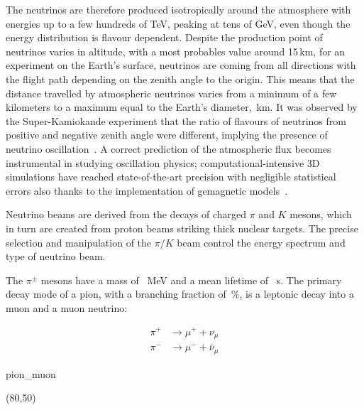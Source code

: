 The neutrinos are therefore produced isotropically around the atmosphere with energies up to a few hundreds of TeV, %
peaking at tens of GeV, even though the energy distribution is flavour dependent.
Despite the production point of neutrinos varies in altitude, with a most probables value around 15\,km,
for an experiment on the Earth's surface, neutrinos are coming from all directions with the flight path depending %
on the zenith angle to the origin.
This means that the distance travelled by atmospheric neutrinos varies from a minimum of a few kilometers %
to a maximum equal to the Earth's diameter, \,km.
It was observed by the Super-Kamiokande experiment that the ratio of flavours of neutrinos from %
positive and negative zenith angle were different, implying the presence of neutrino oscillation~\cite{Fukuda:1998mi}.
A correct prediction of the atmospheric flux becomes instrumental in studying oscillation physics; %
computational-intensive 3D simulations have reached state-of-the-art precision with negligible statistical errors %
also thanks to the implementation of gemagnetic models~\cite{Honda:2004yz, Honda:2006qj}.


Neutrino beams are derived from the decays of charged $\pi$ and $K$ mesons, which in turn are created from %
proton beams striking thick nuclear targets.
The precise selection and manipulation of the $\pi/K$ beam control the energy spectrum and type of neutrino beam.

The $\pi^{\pm}$ mesons have a mass of ~MeV and a mean lifetime of ~s.
The primary decay mode of a pion, with a branching fraction of \,\%, is a leptonic %
decay into a muon and a muon neutrino:

\begin{minipage}[c][3cm][c]{0.5\textwidth}
	\centering
	\begin{align}
		\pi^+ &\rightarrow \mu^+ + \nu_\mu \\
		\pi^- &\rightarrow \mu^- + \bar{\nu}_\mu
	\end{align}
\end{minipage}
%
\begin{minipage}[c][3cm][c]{0.5\textwidth}
	\centering
	\begin{fmffile}{pion_muon}
		\begin{fmfgraph*}(80,50)
		\end{fmfgraph*}
	\end{fmffile}
\end{minipage}

